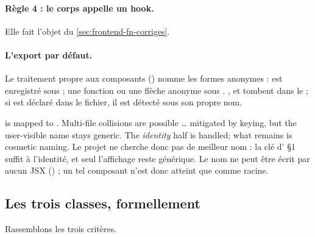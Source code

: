 \paragraph{Règle 4 : le corps appelle un hook.} Elle fait l'objet du \cref{sec:frontend-fn-corriges}.

\paragraph{L'export par défaut.} Le traitement propre aux composants () nomme les formes anonymes :  est enregistré sous  ; une fonction ou une flèche anonyme sous . ,  et  tombent dans le \code{_ => {}} ; si  est déclaré dans le fichier, il est détecté sous son propre nom.

\begin{decision}
\og {} is mapped to . Multi-file collisions are possible … mitigated by  keying, but the user-visible name stays generic. The \emph{identity} half is handled; what remains is cosmetic naming.\fg{} Le projet ne cherche donc pas de meilleur nom : la clé  d' §1 suffit à l'identité, et seul l'affichage reste générique. Le nom  ne peut être écrit par aucun JSX () ; un tel composant n'est donc atteint que comme racine.
\end{decision}

\subsection{Les trois classes, formellement}

Rassemblons les trois critères.

